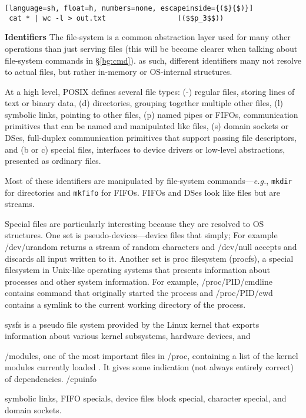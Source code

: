 \documentclass[sigplan,10pt,review,anonymous]{acmart}
\newcommand{\eg}{{\em e.g.}, }
\newcommand{\heading}[1]{\vspace{4pt}\noindent\textbf{#1}\enspace}
\newcommand{\ttt}[1]{\texttt{\small #1}}
\begin{document}
\begin{lstlisting}[language=sh, float=h, numbers=none, escapeinside={($}{$)}]
 cat * | wc -l > out.txt                 (($$p_3$$))
\end{lstlisting}

\heading{Identifiers}
The file-system is a common abstraction layer used for many other operations than just serving files (this will be become clearer when talking about file-system commands in \S\ref{bg:cmd}).
as such, different identifiers many not resolve to actual files, but rather in-memory or OS-internal structures.

At a high level, POSIX defines several file types:
(-) regular files, storing lines of text or binary data,
(d) directories, grouping together multiple other files,
(l) symbolic links, pointing to other files,
(p) named pipes or FIFOs, communication primitives that can be named and manipulated like files,
(s) domain sockets or DSes, full-duplex communication primitives that support passing file descriptors, and
(b or c) special files, interfaces to device drivers or low-level abstractions, presented as ordinary files.

Most of these identifiers are manipulated by file-system commands---\eg \ttt{mkdir} for directories and \ttt{mkfifo} for FIFOs.
FIFOs and DSes look like files but are streams.

Special files are particularly interesting because they are resolved to OS structures.
One set is pseudo-devices---device files that simply;
For example /dev/urandom returns a stream of random characters and /dev/null accepts and discards all input written to it.
Another set is proc filesystem (procfs), a special filesystem in Unix-like operating systems that presents information about processes and other system information.
For example, /proc/PID/cmdline contains command that originally started the process and /proc/PID/cwd contains a symlink to the current working directory of the process.

sysfs is a pseudo file system provided by the Linux kernel that exports information about various kernel subsystems, hardware devices, and 

/modules, one of the most important files in /proc, containing a list of the kernel modules currently loaded . It gives some indication (not always entirely correct) of dependencies.
/cpuinfo

symbolic links, FIFO specials, 
device files
block special, character special, 
and domain sockets.
\end{document}
